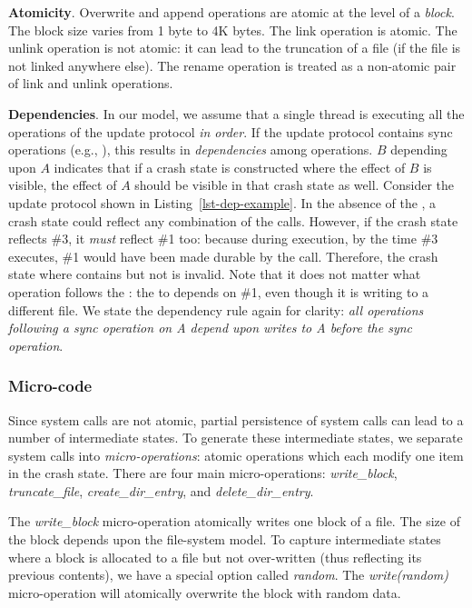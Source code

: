 \textbf{Atomicity}. Overwrite and append operations are atomic at the level of
a \textit{block}. The block size varies from 1 byte to 4K bytes. The link
operation is atomic. The unlink operation is not atomic: it can lead to the
truncation of a file (if the file is not linked anywhere else). The rename
operation is treated as a non-atomic pair of link and unlink operations.

%

\textbf{Dependencies}. In our model, we assume that a single thread is
executing all the operations of the update protocol \textit{in order}. If the
update protocol contains sync operations (e.g., ), this
results in \textit{dependencies} among operations. $B$ depending upon $A$
indicates that if a crash state is constructed where the effect of $B$ is
visible, the effect of $A$ should be visible in that crash state as well.
Consider the update protocol shown in Listing~\ref{lst-dep-example}. In the
absence of the , a crash state could reflect any combination
of the  calls. However, if the crash state reflects \#3,
it \textit{must} reflect \#1 too: because during execution, by the time \#3
executes, \#1 would have been made durable by the  call.
Therefore, the crash state where  contains  but not
 is invalid. Note that it does not matter what operation follows the
: the  to  depends on \#1,
even though it is writing to a different file. We state the dependency rule
again for clarity: \textit{all operations following a sync operation on A
depend upon writes to A before the sync operation}.   

\subsubsection{Micro-code}
\label{sec-micro-code}

%

Since system calls are not atomic, partial persistence of system calls can lead
to a number of intermediate states. To generate these intermediate states, we
separate system calls into \textit{micro-operations}: atomic operations which
each modify one item in the crash state. There are four main micro-operations:
\textit{write\_block}, \textit{truncate\_file}, \textit{create\_dir\_entry}, and
\textit{delete\_dir\_entry}.   

The \textit{write\_block} micro-operation atomically writes one block of a
file. The size of the block depends upon the file-system model. To capture
intermediate states where a block is allocated to a file but not over-written
(thus reflecting its previous contents), we have a special option called
\textit{random}. The \textit{write(random)} micro-operation will atomically
overwrite the block with random data. 

